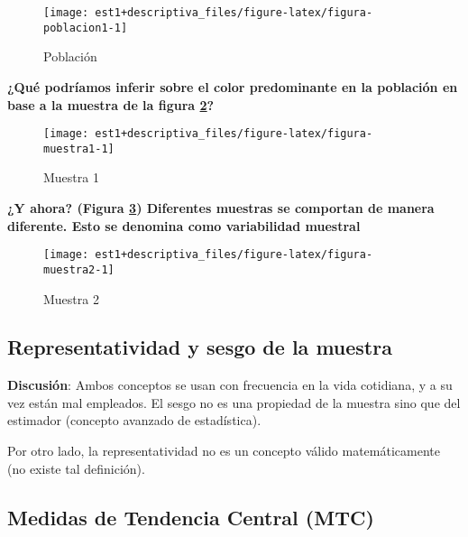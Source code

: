 \documentclass[
]{book}
\theoremstyle{definition}
\theoremstyle{definition}
\theoremstyle{definition}
\theoremstyle{definition}
\theoremstyle{remark}
\begin{document}
\begin{figure}

{\centering \texttt{[image: est1+descriptiva\_files/figure-latex/figura-poblacion1-1]} 

}

\caption{Población}\label{fig:figura-poblacion1}
\end{figure}

\textbf{¿Qué podríamos inferir sobre el color predominante en la población en base a la muestra de la figura \ref{fig:figura-muestra1}?}

\begin{figure}

{\centering \texttt{[image: est1+descriptiva\_files/figure-latex/figura-muestra1-1]} 

}

\caption{Muestra 1}\label{fig:figura-muestra1}
\end{figure}

\textbf{¿Y ahora? (Figura \ref{fig:figura-muestra2}) Diferentes muestras se comportan de manera diferente. Esto se denomina como variabilidad muestral}

\begin{figure}

{\centering \texttt{[image: est1+descriptiva\_files/figure-latex/figura-muestra2-1]} 

}

\caption{Muestra 2}\label{fig:figura-muestra2}
\end{figure}

\hypertarget{representatividad-y-sesgo-de-la-muestra}{%
\subsection*{Representatividad y sesgo de la muestra}\label{representatividad-y-sesgo-de-la-muestra}}

\textbf{Discusión}: Ambos conceptos se usan con frecuencia en la vida cotidiana, y a su vez están mal empleados. El sesgo no es una propiedad de la muestra sino que del estimador (concepto avanzado de estadística).

Por otro lado, la representatividad no es un concepto válido matemáticamente (no existe tal definición).

\hypertarget{medidas-de-tendencia-central-mtc}{%
\subsection*{Medidas de Tendencia Central (MTC)}\label{medidas-de-tendencia-central-mtc}}
\end{document}

